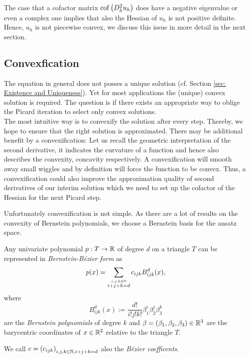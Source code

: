 The case that a cofactor matrix $\operatorname{cof} \left( D^2_h u_h \right) $ does have a negative eigenvalue or even a complex one implies that also the Hessian of $u_h$ is not positive definite. Hence, $u_h$ is not piecewise convex, we discuss this issue in more detail in the next section.


\subsection{Convexfication} \label{subsec: convexification}
 The \MA equation in general does not posses a unique solution (cf. Section \ref{sec: Existence and Uniqueness}). Yet for most applications the (unique) convex solution is required. The question is if there exists an appropriate way to oblige the Picard iteration to select only convex solutions.\\
The most intuitive way is to convexify the solution after every step. Thereby, we hope to ensure that the right solution is approximated. There may be additional benefit by a convexification:
Let us recall the geometric interpretation of the second derivative, it indicates the curvature of a function and hence also describes the convexity, concavity respectively. A convexification will smooth away small wiggles and by definition will force the function to be convex.  Thus, a convexification could also improve the approximation quality of second derivatives of our interim solution which we need to set up the cofactor of the Hessian for the next Picard step. %

Unfortunately convexification is not simple. As there are a lot of results on the convexity of Bernstein polynomials, we choose a Bernstein basis for the ansatz space.
\begin{definition}\label{def: BernsteinBezierForm}
	Any univariate polynomial $p:T \rightarrow \mathbb{R}$ of degree $d$ on a triangle $T$ can be represented in \emph{Bernstein-B\'ezier form} as
\begin{align}
	p(x) = \sum_{\stackrel{i,j,k \in \mathbb{N}}{i+j+k = d}}  c_{ijk} B^d_{ijk}(x),\label{eq: BernsteinBezierForm}
\end{align}
where
\[
	B^d_{ijk}(x) := \frac {d!}{i!j!k!} \beta_1^i \beta_2^j \beta_3^k
\]
are the \emph{Bernstein polynomials} of degree $k$ and $\beta = (\beta_1, \beta_2, \beta_3)\in \mathbb{R}^3$ are the barycentric coordinates of $x \in \mathbb{R}^2$ relative to the triangle $T$.

We call $c=\left(c_{ijk}\right)_{i,j,k \in \mathbb{N}, i+j+k=d}$ also the \emph{B\'ezier coefficents}.
\end{definition}

